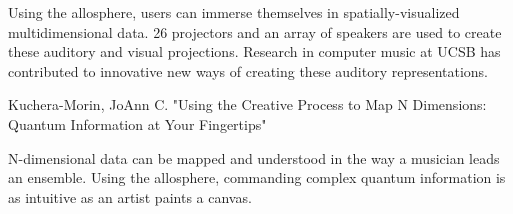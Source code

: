 
Using the allosphere, users can immerse themselves in spatially-visualized multidimensional data. 26 projectors and an array of speakers are used to create these auditory and visual projections. Research in computer music at UCSB has contributed to innovative new ways of creating these auditory representations. 

Kuchera-Morin, JoAnn C. "Using the Creative Process to Map N Dimensions: Quantum Information at Your Fingertips"\cite{allo2}

N-dimensional data can be mapped and understood in the way a musician leads an ensemble. Using the allosphere, commanding complex quantum information is as intuitive as an artist paints a canvas.
